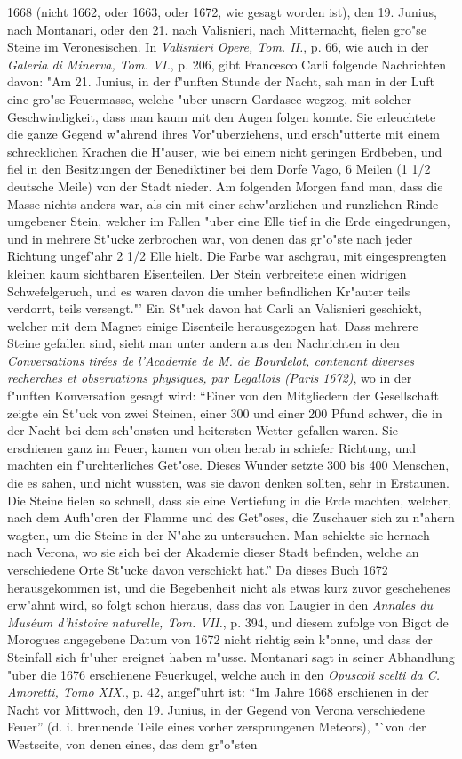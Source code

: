 \documentclass[a4paper, 11pt, oneside, polutonikogreek, german]{article}
\begin{document}
1668 (nicht 1662, oder 1663, oder 1672, wie gesagt worden ist), den 19. Junius, nach Montanari, oder den 21. nach Valisnieri, nach Mitternacht, fielen gro"se Steine im Veronesischen. In \emph{Valisnieri Opere, Tom. II.}, p. 66, wie auch in der \emph{Galeria di Minerva, Tom. VI.}, p. 206, gibt Francesco Carli folgende Nachrichten davon: "Am 21. Junius, in der f"unften Stunde der Nacht, sah man in der Luft eine gro"se Feuermasse, welche "uber unsern Gardasee wegzog, mit solcher Geschwindigkeit, dass man kaum mit den Augen folgen konnte. Sie erleuchtete die ganze Gegend w"ahrend ihres Vor"uberziehens, und ersch"utterte mit einem schrecklichen Krachen die H"auser, wie bei einem nicht geringen Erdbeben, und fiel in den Besitzungen der Benediktiner bei dem Dorfe Vago, 6 Meilen (1 1/2 deutsche Meile) von der Stadt nieder. Am folgenden Morgen fand man, dass die Masse nichts anders war, als ein mit einer schw"arzlichen und runzlichen Rinde umgebener Stein, welcher im Fallen "uber eine Elle tief in die Erde eingedrungen, und in mehrere St"ucke zerbrochen war, von denen das gr"o"ste nach jeder Richtung ungef"ahr 2 1/2 Elle hielt. Die Farbe war aschgrau, mit eingesprengten kleinen kaum sichtbaren Eisenteilen. Der Stein verbreitete einen widrigen Schwefelgeruch, und es waren davon die umher befindlichen Kr"auter teils verdorrt, teils versengt."' Ein St"uck davon hat Carli an Valisnieri geschickt, welcher mit dem Magnet einige Eisenteile herausgezogen hat. Dass mehrere Steine gefallen sind, sieht man unter andern aus den Nachrichten in den \emph{Conversations tirées de l'Academie de M. de Bourdelot, contenant diverses recherches et observations physiques, par Legallois (Paris 1672)}, wo in der f"unften Konversation gesagt wird: "`Einer von den Mitgliedern der Gesellschaft zeigte ein St"uck von zwei Steinen, einer 300 und einer 200 Pfund schwer, die in der Nacht bei dem sch"onsten und heitersten Wetter gefallen waren. Sie erschienen ganz im Feuer, kamen von oben herab in schiefer Richtung, und machten ein f"urchterliches Get"ose. Dieses Wunder setzte 300 bis 400 Menschen, die es sahen, und nicht wussten, was sie davon denken sollten, sehr in Erstaunen. Die Steine fielen so schnell, dass sie eine Vertiefung in die Erde machten, welcher, nach dem Aufh"oren der Flamme und des Get"oses, die Zuschauer sich zu n"ahern wagten, um die Steine in der N"ahe zu untersuchen. Man schickte sie hernach nach Verona, wo sie sich bei der Akademie dieser Stadt befinden, welche an verschiedene Orte St"ucke davon verschickt hat."' Da dieses Buch 1672 herausgekommen ist, und die Begebenheit nicht als etwas kurz zuvor geschehenes erw"ahnt wird, so folgt schon hieraus, dass das von Laugier in den \emph{Annales du Muséum d'histoire naturelle, Tom. VII.}, p. 394, und diesem zufolge von Bigot de Morogues angegebene Datum von 1672 nicht richtig sein k"onne, und dass der Steinfall sich fr"uher ereignet haben m"usse. Montanari sagt in seiner Abhandlung "uber die 1676 erschienene Feuerkugel, welche auch in den \emph{Opuscoli scelti da C. Amoretti, Tomo XIX.}, p. 42, angef"uhrt ist: "`Im Jahre 1668 erschienen in der Nacht vor Mittwoch, den 19. Junius, in der Gegend von Verona verschiedene Feuer"' (d. i. brennende Teile eines vorher zersprungenen Meteors), "`von der Westseite, von denen eines, das dem gr"o"sten 
\end{document}
